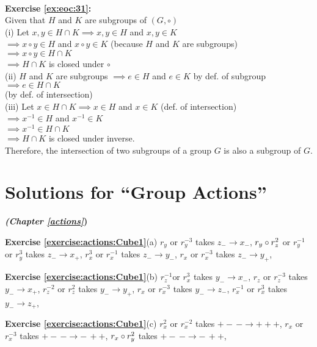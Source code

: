\\
\textbf{Exercise \ref{ex:eoc:31}:}\\
Given that $H$ and $K$ are subgroups of $(G,\circ)$\\
(i) Let $x,y\in H\cap K \implies x,y\in H$ and $x,y\in K$\\
$\implies x\circ y\in H$ and $x\circ y\in K$ (because $H$ and $K$ are subgroups)\\
$\implies x\circ y\in H\cap K$\\
$\implies H\cap K$ is closed under $\circ$\\
(ii) $H$ and $K$ are subgroups $\implies e\in H$ and $e\in K$ by def. of subgroup\\
$\implies e\in H\cap K$\\ (by def. of intersection)\\
(iii) Let $x\in H\cap K \implies x\in H$ and $x\in K$ (def. of intersection)\\
$\implies x^{-1}\in H$ and $x^{-1}\in K$\\
$\implies x^{-1}\in H\cap K$\\
$\implies H\cap K$ is closed under inverse.\\
Therefore, the intersection of two subgroups of a group $G$ is also a subgroup of $G$.\\

\section{Solutions for ``Group Actions''}
\noindent\textbf{\textit{ (Chapter \ref{actions}})}\bigskip

\noindent\textbf{Exercise \ref{exercise:actions:Cube1}}(a)
$r_y$ or $r_y^{-3} $ takes  $z_-\rightarrow x_-$, $r_y\circ r_z^2$ or  $r_y^{-1}$ or $r_y^3$ takes $z_-\rightarrow x_+$, $r_x^3$ or $r_x^{-1}$ takes $z_-\rightarrow y_-$, $r_x$ or $r_x^{-3}$ takes $z_-\rightarrow y_+$,

\noindent\textbf{Exercise \ref{exercise:actions:Cube1}}(b)
$r_z^{-1}$or $r_x^{3}$ takes $y_-\rightarrow x_-$, $r_z$ or $r_z^{-3}$ takes $y_-\rightarrow x_+$, $r_z^{-2}$ or $r_z^{2}$ takes $y_-\rightarrow y_+$, $r_x$ or $r_x^{-3}$ takes $y_-\rightarrow z_-$, $r_x^{-1}$ or $r_x^{3}$ takes $y_-\rightarrow z_+$,

\noindent\textbf{Exercise \ref{exercise:actions:Cube1}}(c)
$r_x^2$ or $r_x^{-2}$ takes $+-\,-\rightarrow +++$,
$r_x$ or $r_x^{-3}$ takes $+-\,-\rightarrow -\,++$, 
$r_x\circ r_y^2$ takes $+-\,-\rightarrow -\,++$, 

